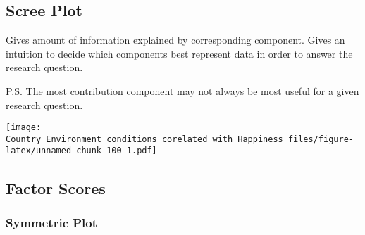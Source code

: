 \documentclass[]{book}
\newenvironment{Shaded}{\begin{snugshade}}{\end{snugshade}}
\newcommand{\DataTypeTok}[1]{\textcolor[rgb]{0.13,0.29,0.53}{#1}}
\newcommand{\KeywordTok}[1]{\textcolor[rgb]{0.13,0.29,0.53}{\textbf{#1}}}
\newcommand{\NormalTok}[1]{#1}
\newcommand{\OperatorTok}[1]{\textcolor[rgb]{0.81,0.36,0.00}{\textbf{#1}}}
\newcommand{\OtherTok}[1]{\textcolor[rgb]{0.56,0.35,0.01}{#1}}
\newcommand{\StringTok}[1]{\textcolor[rgb]{0.31,0.60,0.02}{#1}}
\begin{document}
\hypertarget{scree-plot-6}{%
\subsection{Scree Plot}\label{scree-plot-6}}

Gives amount of information explained by corresponding component. Gives
an intuition to decide which components best represent data in order to
answer the research question.

P.S. The most contribution component may not always be most useful for a
given research question.

\begin{Shaded}
\end{Shaded}

\texttt{[image: Country\_Environment\_conditions\_corelated\_with\_Happiness\_files/figure-latex/unnamed-chunk-100-1.pdf]}

\hypertarget{factor-scores-5}{%
\subsection{Factor Scores}\label{factor-scores-5}}

\hypertarget{symmetric-plot}{%
\subsubsection{Symmetric Plot}\label{symmetric-plot}}

\begin{Shaded}
\end{Shaded}
\end{document}
